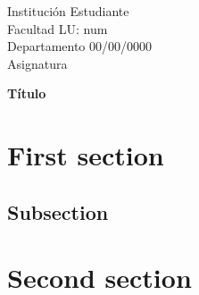 \documentclass{article}
\begin{document}
\begin{flushleft}
	Institución \hfill Estudiante\\ Facultad \hfill LU: num\\ Departamento \hfill 00/00/0000\\ Asignatura
\end{flushleft}

\begin{center}\vspace{0.5cm}
\textbf{ \LARGE Título}
\end{center}
\section{First section}
\lipsum[1]

\subsection{Subsection}
\lipsum[2-3]

\section{Second section}
\lipsum[4]

\end{document}
